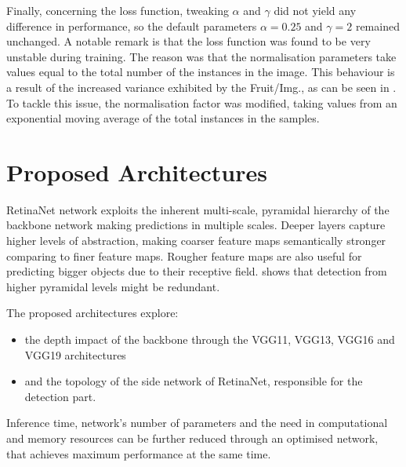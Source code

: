Finally, concerning the loss function, tweaking $\alpha$ and $\gamma$ did not yield any difference in performance, so the default parameters $\alpha=0.25$ and $\gamma=2$ remained unchanged. A notable remark is that the loss function was found to be very unstable during training. The reason was that the normalisation parameters take values equal to the total number of the instances in the image. This behaviour is a result of the increased variance exhibited by the Fruit/Img., as can be seen in . To tackle this issue, the normalisation factor was modified, taking values from an exponential moving average of the total instances in the samples.
 
\section{Proposed Architectures}
RetinaNet network exploits the inherent multi-scale, pyramidal hierarchy of the backbone network making predictions in multiple scales. Deeper layers capture higher levels of abstraction, making coarser feature maps semantically stronger comparing to finer feature maps. Rougher feature maps are also useful for predicting bigger objects due to their receptive field.  shows that detection from higher pyramidal levels might be redundant. 

The proposed architectures explore:
\begin{itemize}
 \item the depth impact of the backbone through the VGG11, VGG13, VGG16 and VGG19 architectures
 \item and the topology of the side network of RetinaNet, responsible for the detection part.
\end{itemize}

Inference time, network's number of parameters and the need in computational and memory resources can be further reduced through an optimised network, that achieves maximum performance at the same time.

